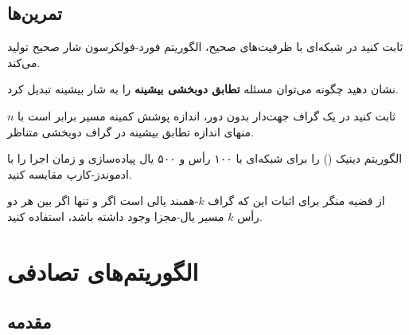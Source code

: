 \documentclass{matinbook}
\begin{document}
    \section{تمرین‌ها}
    
    \begin{exercise}
        ثابت کنید در شبکه‌ای با ظرفیت‌های صحیح،
        الگوریتم فورد-فولکرسون شار صحیح
        تولید می‌کند.
        \label{exc:integral-flow}
    \end{exercise}
    
    \begin{exercise}
        نشان دهید چگونه می‌توان مسئله
        \textbf{تطابق دوبخشی بیشینه} را
        به شار بیشینه تبدیل کرد.
        \label{exc:bipartite-to-flow}
    \end{exercise}
    
    \begin{exercise}
        ثابت کنید در یک گراف جهت‌دار بدون دور،
        اندازه پوشش کمینه مسیر برابر است با
        $n$ منهای اندازه تطابق بیشینه
        در گراف دوبخشی متناظر.
        \label{exc:path-cover}
    \end{exercise}
    
    \begin{exercise}
        الگوریتم دینیک () را برای
        شبکه‌ای با ۱۰۰ رأس و ۵۰۰ یال پیاده‌سازی
        و زمان اجرا را با ادموندز-کارپ مقایسه کنید.
        \label{exc:dinic-vs-ek}
    \end{exercise}
    
    \begin{exercise}
        از قضیه منگر برای اثبات این که
        گراف $k$-همبند یالی است اگر و تنها اگر
        بین هر دو رأس $k$ مسیر یال-مجزا وجود داشته باشد،
        استفاده کنید.
        \label{exc:menger-connectivity}
    \end{exercise}
    
    
    
    \chapter{الگوریتم‌های تصادفی}
    \label{chap:randomized}
    
    \section{مقدمه}
    
\end{document}
